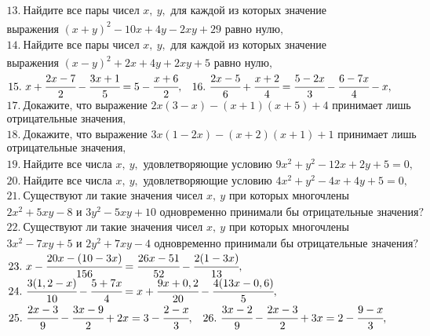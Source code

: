 \documentclass[12pt]{article}
\begin{document}
$\begin{array}{l}
13.\ \text{Найдите все пары чисел }x,\ y, \text{ для каждой из которых значение}\\
\text{выражения }(x+y)^2-10x+4y-2xy+29\text{ равно нулю,}\\
14.\ \text{Найдите все пары чисел }x,\ y, \text{ для каждой из которых значение}\\
\text{выражения }(x-y)^2+2x+4y+2xy+5\text{ равно нулю,}
\end{array}$\\
$\begin{array}{ll}
15.\ x+\cfrac{2x-7}{2}-\cfrac{3x+1}{5}=5-\cfrac{x+6}{2},&
16.\ \cfrac{2x-5}{6}+\cfrac{x+2}{4}=\cfrac{5-2x}{3}-\cfrac{6-7x}{4}-x,
\end{array}$\\
$\begin{array}{l}
17.\ \text{Докажите, что выражение }2x(3-x)-(x+1)(x+5)+4
\text{ принимает лишь}\\ \text{отрицательные значения,}\\
18.\ \text{Докажите, что выражение }3x(1-2x)-(x+2)(x+1)+1
\text{ принимает лишь}\\ \text{отрицательные значения,}\\
19.\ \text{Найдите все числа }x,\ y,\text{ удовлетворяющие условию } 9x^2+y^2-12x+2y+5=0,\\
20.\ \text{Найдите все числа }x,\ y,\text{ удовлетворяющие условию } 4x^2+y^2-4x+4y+5=0,\\
21.\ \text{Существуют ли такие значения чисел }x,\ y \text{ при которых многочлены }\\
2x^2+5xy-8\text{ и } 3y^2-5xy+10\text{ одновременно принимали бы отрицательные значения?}\\
22.\ \text{Существуют ли такие значения чисел }x,\ y \text{ при которых многочлены }\\
3x^2-7xy+5\text{ и } 2y^2+7xy-4\text{ одновременно принимали бы отрицательные значения?}
\end{array}$\\
$\begin{array}{ll}
23.\ x-\cfrac{20x-(10-3x)}{156}=\cfrac{26x-51}{52}-\cfrac{2(1-3x)}{13},\\
24.\ \cfrac{3(1,2-x)}{10}-\cfrac{5+7x}{4}=x+\cfrac{9x+0,2}{20}-\cfrac{4(13x-0,6)}{5},\end{array}$\\
$\begin{array}{ll}25.\ \cfrac{2x-3}{9}-\cfrac{3x-9}{2}+2x=3-\cfrac{2-x}{3},&
26.\ \cfrac{3x-2}{9}-\cfrac{2x-3}{2}+3x=2-\cfrac{9-x}{3},
\end{array}$\\
\end{document}
